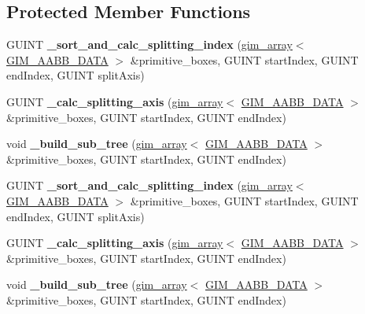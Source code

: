\subsection*{Protected Member Functions}
\begin{DoxyCompactItemize}
\item 
\mbox{\label{classGIM__BOX__TREE_ac9f0e8f8b9b1998bf126001afbd372c9}} 
G\+U\+I\+NT {\bfseries \+\_\+sort\+\_\+and\+\_\+calc\+\_\+splitting\+\_\+index} (\hyperlink{classgim__array}{gim\+\_\+array}$<$ \hyperlink{structGIM__AABB__DATA}{G\+I\+M\+\_\+\+A\+A\+B\+B\+\_\+\+D\+A\+TA} $>$ \&primitive\+\_\+boxes, G\+U\+I\+NT start\+Index, G\+U\+I\+NT end\+Index, G\+U\+I\+NT split\+Axis)
\item 
\mbox{\label{classGIM__BOX__TREE_a36da9ee25d328a3ebd9696c3e3ce8973}} 
G\+U\+I\+NT {\bfseries \+\_\+calc\+\_\+splitting\+\_\+axis} (\hyperlink{classgim__array}{gim\+\_\+array}$<$ \hyperlink{structGIM__AABB__DATA}{G\+I\+M\+\_\+\+A\+A\+B\+B\+\_\+\+D\+A\+TA} $>$ \&primitive\+\_\+boxes, G\+U\+I\+NT start\+Index, G\+U\+I\+NT end\+Index)
\item 
\mbox{\label{classGIM__BOX__TREE_af1432fe0768138ad9749b8f45cea7a47}} 
void {\bfseries \+\_\+build\+\_\+sub\+\_\+tree} (\hyperlink{classgim__array}{gim\+\_\+array}$<$ \hyperlink{structGIM__AABB__DATA}{G\+I\+M\+\_\+\+A\+A\+B\+B\+\_\+\+D\+A\+TA} $>$ \&primitive\+\_\+boxes, G\+U\+I\+NT start\+Index, G\+U\+I\+NT end\+Index)
\item 
\mbox{\label{classGIM__BOX__TREE_ac9f0e8f8b9b1998bf126001afbd372c9}} 
G\+U\+I\+NT {\bfseries \+\_\+sort\+\_\+and\+\_\+calc\+\_\+splitting\+\_\+index} (\hyperlink{classgim__array}{gim\+\_\+array}$<$ \hyperlink{structGIM__AABB__DATA}{G\+I\+M\+\_\+\+A\+A\+B\+B\+\_\+\+D\+A\+TA} $>$ \&primitive\+\_\+boxes, G\+U\+I\+NT start\+Index, G\+U\+I\+NT end\+Index, G\+U\+I\+NT split\+Axis)
\item 
\mbox{\label{classGIM__BOX__TREE_a36da9ee25d328a3ebd9696c3e3ce8973}} 
G\+U\+I\+NT {\bfseries \+\_\+calc\+\_\+splitting\+\_\+axis} (\hyperlink{classgim__array}{gim\+\_\+array}$<$ \hyperlink{structGIM__AABB__DATA}{G\+I\+M\+\_\+\+A\+A\+B\+B\+\_\+\+D\+A\+TA} $>$ \&primitive\+\_\+boxes, G\+U\+I\+NT start\+Index, G\+U\+I\+NT end\+Index)
\item 
\mbox{\label{classGIM__BOX__TREE_af1432fe0768138ad9749b8f45cea7a47}} 
void {\bfseries \+\_\+build\+\_\+sub\+\_\+tree} (\hyperlink{classgim__array}{gim\+\_\+array}$<$ \hyperlink{structGIM__AABB__DATA}{G\+I\+M\+\_\+\+A\+A\+B\+B\+\_\+\+D\+A\+TA} $>$ \&primitive\+\_\+boxes, G\+U\+I\+NT start\+Index, G\+U\+I\+NT end\+Index)
\end{DoxyCompactItemize}
